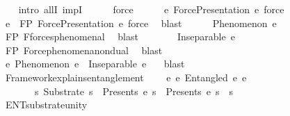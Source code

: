 \begin{isabellebody}
%
\isadelimproof
\ \ %
\endisadelimproof
%
\isatagproof
{}\isamarkupfalse%
\ {\isacharparenleft}{\kern0pt}intro\ allI\ impI{\isacharparenright}{\kern0pt}\isanewline
\ \ \ \ \isamarkupfalse%
\ force\isanewline
\ \ \ \ \isamarkupfalse%
\ {\isachardoublequoteopen}{\isasymexists}e{\isachardot}{\kern0pt}\ ForcePresentation\ e\ force{\isachardoublequoteclose}\isanewline
\ \ \ \ \isamarkupfalse%
\ \isamarkupfalse%
\ e\ \ FP{\isacharcolon}{\kern0pt}\ {\isachardoublequoteopen}ForcePresentation\ e\ force{\isachardoublequoteclose}\ \isamarkupfalse%
\ blast\isanewline
\ \ \ \ \isamarkupfalse%
\ {\isachardoublequoteopen}Phenomenon\ e{\isachardoublequoteclose}\ \isamarkupfalse%
\ FP\ F{}{\isacharunderscore}{\kern0pt}forces{\isacharunderscore}{\kern0pt}phenomenal\ \isamarkupfalse%
\ blast\isanewline
\ \ \ \ \isamarkupfalse%
\ \isamarkupfalse%
\ {\isachardoublequoteopen}Inseparable\ e\ {\isasymOmega}{\isachardoublequoteclose}\ \isamarkupfalse%
\ FP\ Force{\isacharunderscore}{\kern0pt}phenomena{\isacharunderscore}{\kern0pt}nondual\ \isamarkupfalse%
\ blast\isanewline
\ \ \ \ \isamarkupfalse%
\ \isamarkupfalse%
\ {\isachardoublequoteopen}{\isasymexists}e{\isachardot}{\kern0pt}\ Phenomenon\ e\ {\isasymand}\ Inseparable\ e\ {\isasymOmega}{\isachardoublequoteclose}\ \isamarkupfalse%
\ blast\isanewline
\ \ \isamarkupfalse%
%
\endisatagproof
{\isafoldproof}%
%
\isadelimproof
\isanewline
%
\endisadelimproof
\isanewline
\ \ \isamarkupfalse%
\ Framework{\isacharunderscore}{\kern0pt}explains{\isacharunderscore}{\kern0pt}entanglement{\isacharcolon}{\kern0pt}\isanewline
\ \ \ \ {\isachardoublequoteopen}{\isasymforall}e{}\ e{}{\isachardot}{\kern0pt}\ Entangled\ e{}\ e{}\ {\isasymlongrightarrow}\isanewline
\ \ \ \ \ \ \ {\isacharparenleft}{\kern0pt}{\isasymexists}s{\isachardot}{\kern0pt}\ Substrate\ s\ {\isasymand}\ Presents\ e{}\ s\ {\isasymand}\ Presents\ e{}\ s\ {\isasymand}\ s\ {\isacharequal}{\kern0pt}\ {\isasymOmega}{\isacharparenright}{\kern0pt}{\isachardoublequoteclose}\isanewline
%
\isadelimproof
\ \ \ \ %
\endisadelimproof
%
\isatagproof
{}\isamarkupfalse%
\ ENT{}{\isacharunderscore}{\kern0pt}substrate{\isacharunderscore}{\kern0pt}unity\ \isamarkupfalse%

\end{isabellebody}
